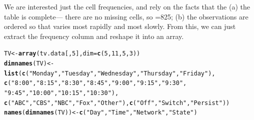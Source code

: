 \documentclass[10pt,twoside]{article}\usepackage[]{graphicx}\usepackage[]{color}
\makeatletter
\newcommand{\hlnum}[1]{\textcolor[rgb]{0.686,0.059,0.569}{#1}}%
\newcommand{\hlstr}[1]{\textcolor[rgb]{0.192,0.494,0.8}{#1}}%
\newcommand{\hlstd}[1]{\textcolor[rgb]{0.345,0.345,0.345}{#1}}%
\newcommand{\hlkwb}[1]{\textcolor[rgb]{0.69,0.353,0.396}{#1}}%
\newcommand{\hlkwc}[1]{\textcolor[rgb]{0.333,0.667,0.333}{#1}}%
\newcommand{\hlkwd}[1]{\textcolor[rgb]{0.737,0.353,0.396}{\textbf{#1}}}%
\newenvironment{kframe}{%
 \def\at@end@of@kframe{}%
 \ifinner\ifhmode%
  \def\at@end@of@kframe{\end{minipage}}%
  \begin{minipage}{\columnwidth}%
 \fi\fi%
 \def\FrameCommand##1{\hskip\@totalleftmargin \hskip-\fboxsep
 \colorbox{shadecolor}{##1}\hskip-\fboxsep
     \hskip-\linewidth \hskip-\@totalleftmargin \hskip\columnwidth}%
 \MakeFramed {\advance\hsize-\width
   \@totalleftmargin\z@ \linewidth\hsize
   \@setminipage}}%
 {\par\unskip\endMakeFramed%
 \at@end@of@kframe}
\newenvironment{knitrout}{}{} %
\makeatother
\begin{document}
We are interested just the cell frequencies, and rely on the facts that the
(a) the table is complete--- there are no missing cells,
so =825;
(b) the observations are ordered so that  varies most rapidly and
 most slowly.  From this, we can just extract the frequency column
and reshape it into an array.
\begin{knitrout}
\color{fgcolor}\begin{kframe}
\begin{alltt}
\hlstd{TV} \hlkwb{<-} \hlkwd{array}\hlstd{(tv.data[,}\hlnum{5}\hlstd{],} \hlkwc{dim}\hlstd{=}\hlkwd{c}\hlstd{(}\hlnum{5}\hlstd{,}\hlnum{11}\hlstd{,}\hlnum{5}\hlstd{,}\hlnum{3}\hlstd{))}
\hlkwd{dimnames}\hlstd{(TV)} \hlkwb{<-} \hlkwd{list}\hlstd{(}\hlkwd{c}\hlstd{(}\hlstr{"Monday"}\hlstd{,}\hlstr{"Tuesday"}\hlstd{,}\hlstr{"Wednesday"}\hlstd{,}\hlstr{"Thursday"}\hlstd{,}\hlstr{"Friday"}\hlstd{),}
                \hlkwd{c}\hlstd{(}\hlstr{"8:00"}\hlstd{,}\hlstr{"8:15"}\hlstd{,}\hlstr{"8:30"}\hlstd{,}\hlstr{"8:45"}\hlstd{,}\hlstr{"9:00"}\hlstd{,}\hlstr{"9:15"}\hlstd{,}\hlstr{"9:30"}\hlstd{,}
                  \hlstr{"9:45"}\hlstd{,}\hlstr{"10:00"}\hlstd{,}\hlstr{"10:15"}\hlstd{,}\hlstr{"10:30"}\hlstd{),}
                \hlkwd{c}\hlstd{(}\hlstr{"ABC"}\hlstd{,}\hlstr{"CBS"}\hlstd{,}\hlstr{"NBC"}\hlstd{,}\hlstr{"Fox"}\hlstd{,}\hlstr{"Other"}\hlstd{),} \hlkwd{c}\hlstd{(}\hlstr{"Off"}\hlstd{,}\hlstr{"Switch"}\hlstd{,}\hlstr{"Persist"}\hlstd{))}
\hlkwd{names}\hlstd{(}\hlkwd{dimnames}\hlstd{(TV))}\hlkwb{<-}\hlkwd{c}\hlstd{(}\hlstr{"Day"}\hlstd{,} \hlstr{"Time"}\hlstd{,} \hlstr{"Network"}\hlstd{,} \hlstr{"State"}\hlstd{)}
\end{alltt}
\end{kframe}
\end{knitrout}
\end{document}
